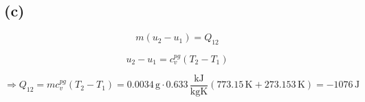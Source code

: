 

\subsection*{(c)}

\[
m (u_2 - u_1) = Q_{12}
\]

\[
u_2 - u_1 = c_v^{pg} (T_2 - T_1)
\]

\[
\Rightarrow Q_{12} = m c_v^{pg} (T_2 - T_1) = 0.0034 \, \text{g} \cdot 0.633 \, \frac{\text{kJ}}{\text{kgK}} (773.15 \, \text{K} + 273.153 \, \text{K}) = -1076 \, \text{J}
\]